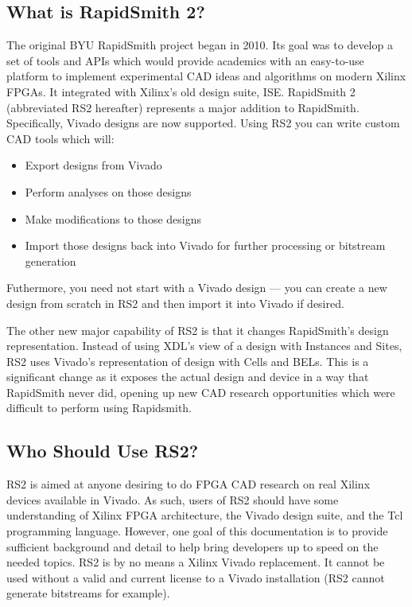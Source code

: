 \documentclass[10pt]{article}
\begin{document}
\subsection{What is RapidSmith 2?}
The original BYU RapidSmith project began in 2010. Its goal was to develop
a set of tools and APIs which would provide academics with an
easy-to-use platform to implement experimental CAD ideas and algorithms on
modern Xilinx FPGAs. It integrated with Xilinx's old design suite, ISE.
RapidSmith 2 (abbreviated RS2 hereafter) represents a major addition to
RapidSmith. Specifically, Vivado designs are now supported. Using RS2 you can
write custom CAD tools which will: 
\begin{itemize}
  \item Export designs from Vivado
  \item Perform analyses on those designs
  \item Make modifications to those designs
  \item Import those designs back into Vivado for further processing or
  bitstream generation
\end{itemize}
Futhermore, you need not start with a Vivado design --- 
you can create a new design from scratch in RS2 and then import it into Vivado
if desired.

The other new major capability of RS2 is that it changes RapidSmith's design
representation. Instead of using XDL's view of a design with Instances and
Sites, RS2 uses Vivado's representation of design with Cells and BELs. This
is a significant change as it exposes the actual design and device in a way
that RapidSmith never did, opening up new CAD research opportunities which were
difficult to perform using Rapidsmith.
       
\subsection{Who Should Use RS2?}
RS2 is aimed at anyone desiring to do FPGA CAD research on real Xilinx devices
available in Vivado. As such, users of RS2 should have some understanding of
Xilinx FPGA architecture, the Vivado design suite, and the Tcl programming
language. However, one goal of this documentation is to provide sufficient
background and detail to help bring developers up to speed on the needed
topics. RS2 is by no means a Xilinx Vivado replacement. It cannot be used
without a valid and current license to a Vivado installation (RS2
cannot generate bitstreams for example).
\end{document}
